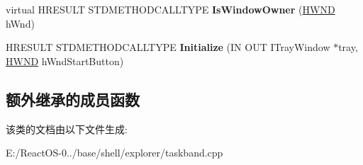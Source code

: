 \begin{DoxyCompactItemize}
\item 
\mbox{\label{class_c_task_band_a8e2d4c74c8022879ef2d04a945c308d2}} 
virtual H\+R\+E\+S\+U\+LT S\+T\+D\+M\+E\+T\+H\+O\+D\+C\+A\+L\+L\+T\+Y\+PE {\bfseries Is\+Window\+Owner} (\hyperlink{interfacevoid}{H\+W\+ND} h\+Wnd)
\item 
\mbox{\label{class_c_task_band_abe4b4f3f9a8b2540b96954c681003fe7}} 
H\+R\+E\+S\+U\+LT S\+T\+D\+M\+E\+T\+H\+O\+D\+C\+A\+L\+L\+T\+Y\+PE {\bfseries Initialize} (IN O\+UT I\+Tray\+Window $\ast$tray, \hyperlink{interfacevoid}{H\+W\+ND} h\+Wnd\+Start\+Button)
\end{DoxyCompactItemize}
\subsection*{额外继承的成员函数}


该类的文档由以下文件生成\+:\begin{DoxyCompactItemize}
\item 
E\+:/\+React\+O\+S-\/0../base/shell/explorer/taskband.\+cpp\end{DoxyCompactItemize}
